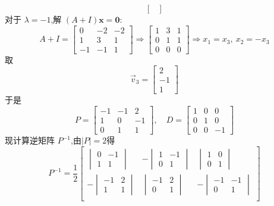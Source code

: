 \begin{questions}
\begin{solution}
\[\begin{bmatrix}
        \end{bmatrix}
        \]
        对于 $\lambda = -1$,解 $(A + I)\textbf{x} = \textbf{0}$:
        \[
        A + I =
        \begin{bmatrix}
        0 & -2 & -2 \\
        1 & 3 & 1 \\
        -1 & -1 & 1
        \end{bmatrix}
        \Rightarrow
        \begin{bmatrix}
        1 & 3 & 1 \\
        0 & 1 & 1 \\
        0 & 0 & 0
        \end{bmatrix} \Rightarrow x_1 = x_3,\ x_2 = -x_3
        \]
        取
        \[
        \vec{v}_3 =
        \begin{bmatrix}
        2 \\ -1 \\ 1
        \end{bmatrix}
        \]
        于是
        \[
        P =
        \begin{bmatrix}
        -1 & -1 & 2 \\
        1 & 0 & -1 \\
        0 & 1 & 1
        \end{bmatrix}, \quad
        D =
        \begin{bmatrix}
        1 & 0 & 0 \\
        0 & 1 & 0 \\
        0 & 0 & -1
        \end{bmatrix}
        \]
        现计算逆矩阵 \(P^{-1}\),由$|P|=2$得
        \[
        P^{-1} 
        =\frac{1}{2}
        \begin{bmatrix}
        \begin{vmatrix} 0 & -1 \\ 1 & 1 \end{vmatrix} & -\begin{vmatrix} 1 & -1 \\ 0 & 1 \end{vmatrix} & \begin{vmatrix} 1 & 0 \\ 0 & 1 \end{vmatrix} \\
        -\begin{vmatrix} -1 & 2 \\ 1 & 1 \end{vmatrix} & \begin{vmatrix} -1 & 2 \\ 0 & 1 \end{vmatrix} & -\begin{vmatrix} -1 & -1 \\ 0 & 1 \end{vmatrix} \\

\end{bmatrix}\]
\end{solution}
\end{questions}
